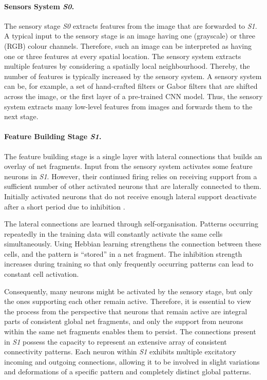\paragraph{Sensors System \emph{S0}.} The sensory stage \emph{S0} extracts features from the image that are forwarded to \emph{S1}.
A typical input to the sensory stage is an image having one (grayscale) or three (RGB) colour channels. Therefore, such an image can be interpreted as having one or three features at every spatial location.
The sensory system extracts multiple features by considering a spatially local neighbourhood. Thereby, the number of features is typically increased by the sensory system.
A sensory system can be, for example, a set of hand-crafted filters or Gabor filters that are shifted across the image, or the first layer of a pre-trained CNN model.
Thus, the sensory system extracts many low-level features from images and forwards them to the next stage.

\paragraph{Feature Building Stage \emph{S1}.} The feature building stage is a single layer with lateral connections  that builds an overlay of net fragments. Input from the sensory system activates some feature neurons in \emph{S1}. However, their continued firing relies on receiving support from a sufficient number of other activated neurons that are laterally connected to them. Initially activated neurons that do not receive enough lateral support deactivate after a short period due to inhibition .

The lateral connections are learned through self-organisation. Patterns occurring repeatedly in the training data will constantly activate the same cells simultaneously. Using Hebbian learning strengthens the connection between these cells, and the pattern is ``stored'' in a net fragment. The inhibition strength increases during training so that only frequently occurring patterns can lead to constant cell activation.

Consequently, many neurons might be activated by the sensory stage, but only the ones supporting each other remain active.
Therefore, it is essential to view the process from the perspective that neurons that remain active are integral parts of consistent global net fragments, and only the support from neurons within the same net fragments enables them to persist.
The connections present in \emph{S1} possess the capacity to represent an extensive array of consistent connectivity patterns. Each neuron within \emph{S1} exhibits multiple excitatory incoming and outgoing connections, allowing it to be involved in slight variations and deformations of a specific pattern and completely distinct global patterns. 

